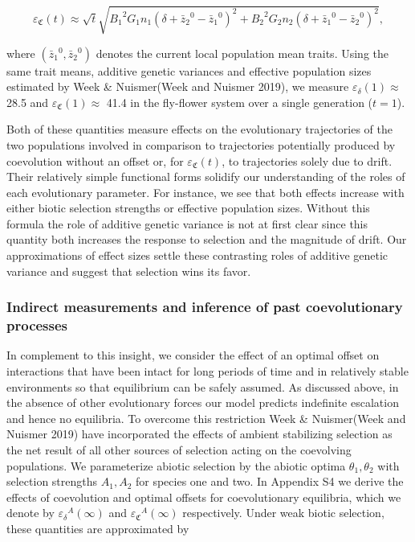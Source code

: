 \documentclass[]{article}
\begin{document}
\begin{equation}
\varepsilon_\mathfrak{C}(t)\approx\sqrt t\sqrt{
{B_1}^2G_1n_1\left(\delta+{\bar{z}_2}^0-{\bar{z}_1}^0\right)^2+
{B_2}^2G_2n_2\left(\delta+{\bar{z}_1}^0-{\bar{z}_2}^0\right)^2},
\end{equation}

where \(({\bar{z}_1}^0,{\bar{z}_2}^0)\) denotes the current local
population mean traits. Using the same trait means, additive genetic
variances and effective population sizes estimated by Week \&
Nuismer(Week and Nuismer 2019), we measure
\(\varepsilon_\delta(1)\approx\) 28.5 and
\(\varepsilon_\mathfrak{C}(1)\approx\) 41.4 in the fly-flower system
over a single generation (\(t=1\)).

Both of these quantities measure effects on the evolutionary
trajectories of the two populations involved in comparison to
trajectories potentially produced by coevolution without an offset or,
for \(\varepsilon_\mathfrak{C}(t)\), to trajectories solely due to
drift. Their relatively simple functional forms solidify our
understanding of the roles of each evolutionary parameter. For instance,
we see that both effects increase with either biotic selection strengths
or effective population sizes. Without this formula the role of additive
genetic variance is not at first clear since this quantity both
increases the response to selection and the magnitude of drift. Our
approximations of effect sizes settle these contrasting roles of
additive genetic variance and suggest that selection wins its favor.

\hypertarget{indirect-measurements-and-inference-of-past-coevolutionary-processes}{%
\subsubsection{Indirect measurements and inference of past
coevolutionary
processes}\label{indirect-measurements-and-inference-of-past-coevolutionary-processes}}

In complement to this insight, we consider the effect of an optimal
offset on interactions that have been intact for long periods of time
and in relatively stable environments so that equilibrium can be safely
assumed. As discussed above, in the absence of other evolutionary forces
our model predicts indefinite escalation and hence no equilibria. To
overcome this restriction Week \& Nuismer(Week and Nuismer 2019) have
incorporated the effects of ambient stabilizing selection as the net
result of all other sources of selection acting on the coevolving
populations. We parameterize abiotic selection by the abiotic optima
\(\theta_1,\theta_2\) with selection strengths \(A_1,A_2\) for species
one and two. In Appendix S4 we derive the effects of coevolution and
optimal offsets for coevolutionary equilibria, which we denote by
\({\varepsilon_\delta}^A(\infty)\) and
\({\varepsilon_\mathfrak{C}}^A(\infty)\) respectively. Under weak biotic
selection, these quantities are approximated by
\end{document}
